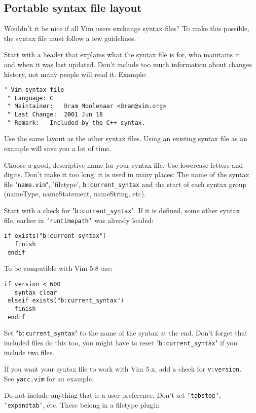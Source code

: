 \subsection{Portable syntax file layout}
Wouldn't it be nice if all Vim users exchange syntax files?  To make this possible, the syntax file must follow a few guidelines.

Start with a header that explains what the syntax file is for, who maintains it and when it was last updated.
Don't include too much information about changes history, not many people will read it.
Example:

\begin{Verbatim}[samepage=true]
 " Vim syntax file
 " Language: C
 " Maintainer:   Bram Moolenaar <Bram@vim.org>
 " Last Change:  2001 Jun 18
 " Remark:   Included by the C++ syntax.
\end{Verbatim}

Use the same layout as the other syntax files.
Using an existing syntax file as an example will save you a lot of time.

Choose a good, descriptive name for your syntax file.
Use lowercase letters and digits.
Don't make it too long, it is used in many places: The name of the syntax file "\texttt{name.vim}", 'filetype', \texttt{b:current\_syntax} and the start of each syntax group (nameType, nameStatement, nameString, etc).

Start with a check for "\texttt{b:current\_syntax}".
If it is defined, some other syntax file, earlier in \texttt{'runtimepath'} was already loaded:

\begin{Verbatim}[samepage=true]
 if exists("b:current_syntax")
   finish
 endif
\end{Verbatim}

To be compatible with Vim 5.8 use:

\begin{Verbatim}[samepage=true]
 if version < 600
   syntax clear
 elseif exists("b:current_syntax")
   finish
 endif
\end{Verbatim}

Set "\texttt{b:current\_syntax}" to the name of the syntax at the end.
Don't forget that included files do this too, you might have to reset "\texttt{b:current\_syntax}" if you include two files.

If you want your syntax file to work with Vim 5.x, add a check for \texttt{v:version}.
See \texttt{yacc.vim} for an example.

Do not include anything that is a user preference.
Don't set \texttt{'tabstop'}, \texttt{'expandtab'}, etc.
These belong in a filetype plugin.

